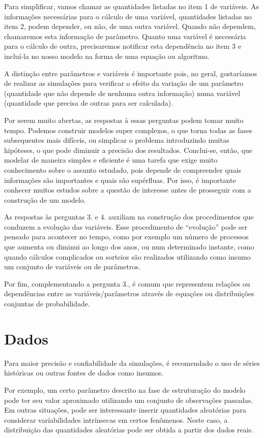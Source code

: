 \documentclass[]{book}
\begin{document}
Para simplificar, vamos chamar as quantidades listadas no item 1 de
variáveis. As informações necessárias para o cálculo de uma variável,
quantidades listadas no item 2, podem depender, ou não, de uma outra
variável. Quando não dependem, chamaremos esta informação de parâmetro.
Quanto uma variável é necessária para o cálculo de outra, precisaremos
notificar esta dependência no item 3 e incluí-la no nosso modelo na
forma de uma equação ou algoritmo.

A distinção entre parâmetros e variáveis é importante pois, no geral,
gostaríamos de realizar as simulações para verificar o efeito da
variação de um parâmetro (quantidade que não depende de nenhuma outra
informação) numa variável (quantidade que precisa de outras para ser
calculada).

Por serem muito abertas, as respostas à essas perguntas podem tomar
muito tempo. Podemos construir modelos super complexos, o que torna
todas as fases subsequentes mais difíceis, ou simplicar o problema
introduzindo muitas hipóteses, o que pode diminuir a precisão dos
resultados. Conclui-se, então, que modelar de maneira simples e
eficiente é uma tarefa que exige muito conhecimento sobre o assunto
estudado, pois depende de compreender quais informações são importantes
e quais são supérfluas. Por isso, é importante conhecer muitos estudos
sobre a questão de interesse antes de prosseguir com a construção de um
modelo.

As respostas às perguntas 3. e 4. auxiliam na construção dos
procedimentos que conduzem a evolução das variáveis. Esse procedimento
de ``evolução'' pode ser pensado para acontecer no tempo, como por
exemplo um número de processos que aumenta ou diminui ao longo dos anos,
ou num determinado instante, como quando cálculos complicados ou
sorteios são realizados utilizando como insumo um conjunto de variáveis
ou de parâmetros.

Por fim, complementando a pergunta 3., é comum que representem relações
ou dependências entre as variáveis/parâmetros através de equações ou
distribuições conjuntas de probabilidade.

\section{Dados}\label{dados}

Para maior precisão e confiabilidade da simulações, é recomendado o uso
de séries históricas ou outras fontes de dados como insumos.

Por exemplo, um certo parâmetro descrito na fase de estruturação do
modelo pode ter seu valor aproximado utilizando um conjunto de
observações passadas. Em outras situações, pode ser interessante inserir
quantidades aleatórias para considerar variabilidades intrínsecas em
certos fenômenos. Neste caso, a distribuição das quantidades aleatórias
pode ser obtida a partir dos dados reais.
\end{document}
